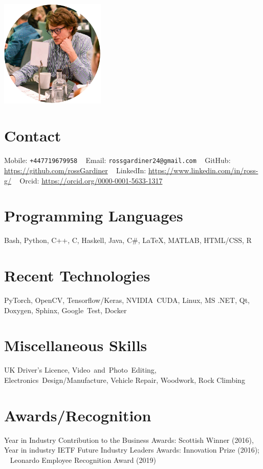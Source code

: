 \documentclass[]{cv-style}     %
\begin{document}
\lastupdated

\begin{aside}
\includegraphics[width=5cm]{p1000137-cropped.jpg}
\vspace{-0.3cm}
\section{Contact}
\vspace{0.1cm}Mobile: \texttt{+447719679958}
~
Email: \texttt{rossgardiner24@gmail.com}
~
GitHub: \url{https://github.com/rossGardiner}
~
LinkedIn: \url{https://www.linkedin.com/in/ross-g/}
~ 
Orcid: \url{https://orcid.org/0000-0001-5633-1317}
%

\section{Programming Languages}
Bash, Python, C++, C, Haskell, Java, C\#, \LaTeX, MATLAB, HTML/CSS, R
%
\section{Recent Technologies}
PyTorch, OpenCV, Tensorflow/Keras, NVIDIA~CUDA, Linux, MS .NET, Qt, Doxygen, Sphinx, Google~Test, Docker
\section{Miscellaneous Skills}
UK Driver's Licence, Video~and~Photo~Editing,
Electronics~Design/Manufacture, Vehicle Repair, Woodwork, Rock Climbing
\vspace{-0.2}
\section{Awards/Recognition}
Year in Industry Contribution to the Business Awards: Scottish Winner (2016),
~
Year in industry IETF Future Industry Leaders Awards: Innovation Prize (2016);
~
Leonardo Employee Recognition Award (2019)
\end{aside}
  \vspace{-0.4cm}
\end{document}
